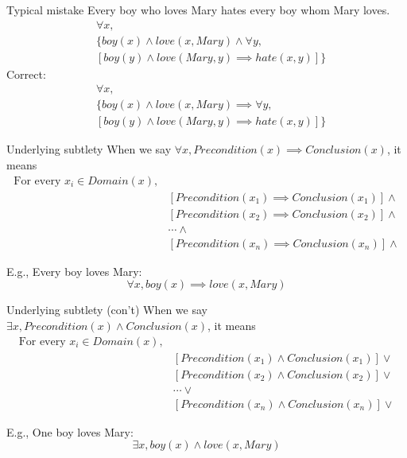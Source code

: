 \documentclass{beamer}
\begin{document}
\begin{frame}{Typical mistake}
Every boy who loves Mary hates every boy whom Mary loves.
	\[
	\begin{split}
		&\forall x, \\
		& \{boy(x) \land love(x, Mary) \land \forall y, \\
		& [boy(y) \land love(Mary, y) \implies hate(x,y)]\}
	\end{split}
	\]
\pause
	\alert{
Correct:
	\[
	\begin{split}
		&\forall x, \\
		& \{boy(x) \land love(x, Mary) \implies \forall y, \\
		& [boy(y) \land love(Mary, y) \implies hate(x,y)]\}
	\end{split}
	\]
	}

\end{frame}

\begin{frame}{Underlying subtlety}
When we say $\forall x, Precondition(x) \implies Conclusion(x)$, it means
\[
\begin{split}
\text{For every $x_i\in Domain(x)$}, & \\
& [Precondition(x_1) \implies Conclusion(x_1)] \land \\
& [Precondition(x_2) \implies Conclusion(x_2)] \land \\
& \cdots \land \\
& [Precondition(x_n) \implies Conclusion(x_n)] \land
\end{split}
\]
\begin{exampleblock}{E.g., Every boy loves Mary:}
$$\forall x, boy(x) \implies love(x, Mary)$$
\end{exampleblock}
\end{frame}

\begin{frame}{Underlying subtlety (con't)}
When we say $\exists x, Precondition(x) \land Conclusion(x)$, it means
\[
\begin{split}
\text{For every $x_i\in Domain(x)$}, & \\
& [Precondition(x_1) \land Conclusion(x_1)] \lor \\
& [Precondition(x_2) \land Conclusion(x_2)] \lor \\
& \cdots \lor \\
& [Precondition(x_n) \land Conclusion(x_n)] \lor
\end{split}
\]
\begin{exampleblock}{E.g., One boy loves Mary:}
$$\exists x, boy(x) \land love(x, Mary)$$
\end{exampleblock}
\end{frame}
\end{document}

